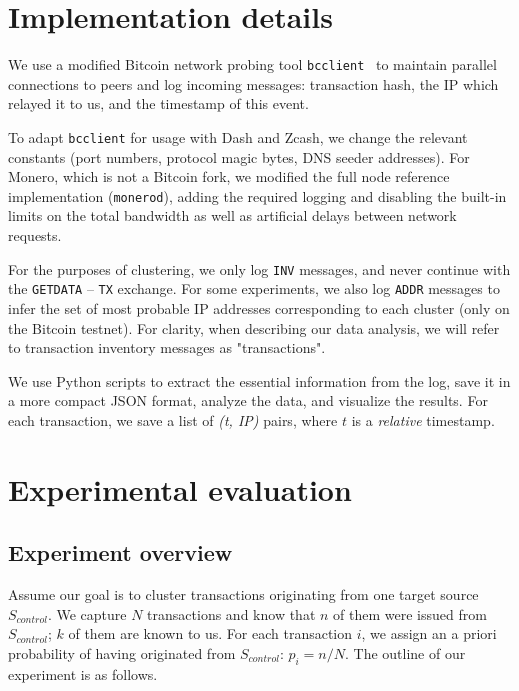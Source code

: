 \section{Implementation details}

We use a modified Bitcoin network probing tool \texttt{bcclient}~\cite{Pustogarov2017} to maintain parallel connections to peers and log incoming messages: transaction hash, the IP which relayed it to us, and the timestamp of this event.

To adapt \texttt{bcclient} for usage with Dash and Zcash, we change the relevant constants (port numbers, protocol magic bytes, DNS seeder addresses).
For Monero, which is not a Bitcoin fork, we modified the full node reference implementation (\texttt{monerod}), adding the required logging and disabling the built-in limits on the total bandwidth as well as artificial delays between network requests.

For the purposes of clustering, we only log \texttt{INV} messages, and never continue with the \texttt{GETDATA} -- \texttt{TX} exchange.
For some experiments, we also log \texttt{ADDR} messages to infer the set of most probable IP addresses corresponding to each cluster (only on the Bitcoin testnet).
For clarity, when describing our data analysis, we will refer to transaction inventory messages as "transactions".

We use Python scripts to extract the essential information from the log, save it in a more compact JSON format, analyze the data, and visualize the results.
For each transaction, we save a list of \textit{(t, IP)} pairs, where $t$ is a \textit{relative} timestamp.

\section{Experimental evaluation}

\subsection{Experiment overview}

Assume our goal is to cluster transactions originating from one target source $S_{control}$.
We capture $N$ transactions and know that $n$ of them were issued from $S_{control}$; $k$ of them are known to us.
For each transaction $i$, we assign an a priori probability of having originated from $S_{control}$: $p_i = n / N$.
The outline of our experiment is as follows.

